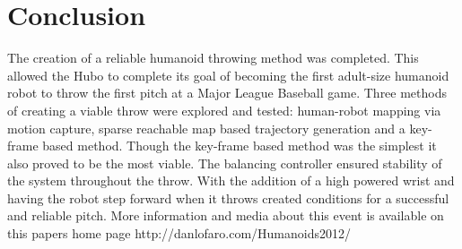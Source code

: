 \section{Conclusion}\label{sec:conclusion}
The creation of a reliable humanoid throwing method was completed. 
This allowed the Hubo to complete its goal of becoming the first adult-size humanoid robot to throw the first pitch at a Major League Baseball game.
Three methods of creating a viable throw were explored and tested: human-robot mapping via motion capture, sparse reachable map based trajectory generation and a key-frame based method.  
Though the key-frame based method was the simplest it also proved to be the most viable.  
The balancing controller ensured stability of the system throughout the throw.  
With the addition of a high powered wrist and having the robot step forward when it throws created conditions for a successful and reliable pitch.  More information and media about this event is available on this papers home page http://danlofaro.com/Humanoids2012/